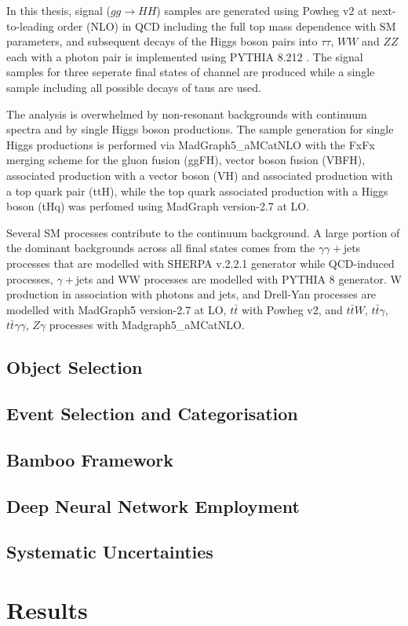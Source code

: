 In this thesis, signal ($gg \rightarrow HH$) samples are generated using Powheg v2 \cite{Nason2004, Frixione2007, Alioli2010, Heinrich2019} at next-to-leading order (NLO) in QCD including the full top mass dependence with SM parameters, and subsequent decays of the Higgs boson pairs into $\tau\tau$, $WW$ and $ZZ$ each with a photon pair is implemented using PYTHIA 8.212 \cite{Sjstrand2015}. The signal samples for three seperate final states of \wwgg channel are produced while a single sample including all possible decays of taus are used.

The analysis is overwhelmed by non-resonant backgrounds with continuum \mgg spectra and by single Higgs boson productions. The sample generation for single Higgs productions is performed via MadGraph5\_aMCatNLO \cite{Alwall2014, Artoisenet2013} with the FxFx merging scheme \cite{Frederix2012} for the gluon fusion (ggFH), vector boson fusion (VBFH), associated production with a vector boson (VH) and associated production with a top quark pair (ttH), while the top quark associated production  with a Higgs boson (tHq) was perfomed using MadGraph version-2.7 at LO.

Several SM processes contribute to the continuum background. A large portion of the dominant backgrounds across all final states comes from the $\gamma\gamma+$jets processes that are modelled with SHERPA v.2.2.1 generator \cite{10.21468/SciPostPhys.7.3.034}while QCD-induced processes, $\gamma+$jets and WW processes are modelled with PYTHIA 8 generator. W production in association with photons and jets, and Drell-Yan processes are modelled with MadGraph5 version-2.7 at LO, $t\bar t$ with Powheg v2, and $t\bar tW$, $t\bar t\gamma$, $t\bar t\gamma\gamma$, $Z\gamma$ processes with Madgraph5\_aMCatNLO.

\subsection{Object Selection}

\subsection{Event Selection and Categorisation}

\subsection{Bamboo Framework}

\subsection{Deep Neural Network Employment}

\subsection{Systematic Uncertainties}

\section{Results}